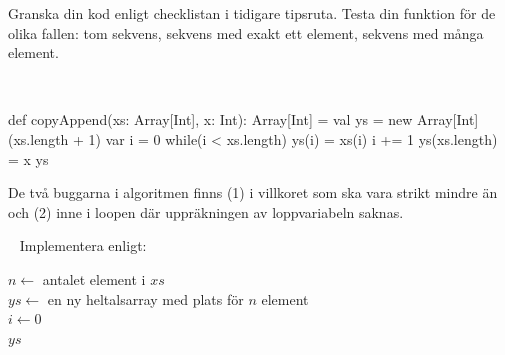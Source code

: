 \noindent Granska din kod enligt checklistan i tidigare tipsruta. Testa din funktion för de olika fallen: tom sekvens, sekvens med exakt ett element, sekvens med många element.


\SOLUTION

\TaskSolved \what~

\begin{Code}
def copyAppend(xs: Array[Int], x: Int): Array[Int] = {
  val ys = new Array[Int](xs.length + 1)
  var i = 0
  while(i < xs.length) {
    ys(i) = xs(i)
    i += 1
  }
  ys(xs.length) = x
  ys
}
\end{Code}
De två buggarna i algoritmen finns (1) i villkoret som ska vara strikt mindre än och (2) inne i loopen där uppräkningen av loppvariabeln saknas.

\QUESTEND



%
%
%
%
%
%
%
%
%
%
%




\QUESTBEGIN

\Task  \what~  Implementera  enligt:

\begin{algorithm}[H]

 $n \leftarrow$ antalet element i $xs$ \\
 $ys \leftarrow$ en ny heltalsarray med plats för $n$ element\\
 $i \leftarrow 0$  \\
 \Return $ys$
\end{algorithm}

